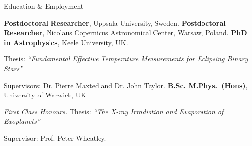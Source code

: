 \begin{rubric}{Education \& Employment}

\entry*[2024 -- ~~~~~\,\,\,~~~]%
    \textbf{Postdoctoral Researcher}, Uppsala University, Sweden.
%
\entry*[2023 -- 2024]%
    \textbf{Postdoctoral Researcher}, Nicolaus Copernicus Astronomical Center, Warsaw, Poland. 
%
\entry*[2018 -- 2022]%
	\textbf{PhD in Astrophysics}, Keele University, UK. 
	\par Thesis: \emph{``Fundamental Effective Temperature Measurements for Eclipsing Binary Stars''} \par Supervisors: Dr. Pierre Maxted and Dr. John Taylor.
%
\entry*[2014 -- 2018]%
	\textbf{B.Sc. M.Phys.~(Hons)}, University of Warwick, UK.
	\par \emph{First Class Honours.}
	Thesis: \emph{``The X-ray Irradiation and Evaporation of Exoplanets''} \par Supervisor: Prof. Peter Wheatley.
%
\end{rubric}